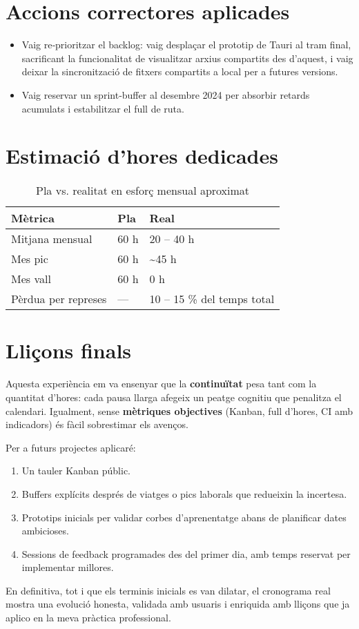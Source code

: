 \section{Accions correctores aplicades}
\begin{itemize}
  \item Vaig re‑prioritzar el backlog: vaig desplaçar el prototip de Tauri al tram final, sacrificant la funcionalitat de visualitzar arxius compartits des d'aquest, i vaig deixar la sincronització de fitxers compartits a local per a futures versions.
  \item Vaig reservar un sprint‑buffer al desembre 2024 per absorbir retards acumulats i estabilitzar el full de ruta.
\end{itemize}

\section{Estimació d'hores dedicades}

\begin{table}[h]
  \centering
  \caption{Pla vs. realitat en esforç mensual aproximat}
  \label{tab:horas}
  \begin{tabular}{@{}p{3.2cm}p{3cm}p{3cm}@{}}
    \toprule
    \textbf{Mètrica} & \textbf{Pla} & \textbf{Real} \\
    \midrule
    Mitjana mensual & 60 h & 20 – 40 h \\
    Mes pic & 60 h & \textasciitilde45 h \\
    Mes vall & 60 h & 0 h \\
    Pèrdua per represes & — & 10 – 15 \% del temps total \\
    \bottomrule
  \end{tabular}
\end{table}

\section{Lliçons finals}

Aquesta experiència em va ensenyar que la \textbf{continuïtat} pesa tant com la quantitat d'hores: cada pausa llarga afegeix un peatge cognitiu que penalitza el calendari. Igualment, sense \textbf{mètriques objectives} (Kanban, full d'hores, CI amb indicadors) és fàcil sobrestimar els avenços.

Per a futurs projectes aplicaré:
\begin{enumerate}
  \item Un tauler Kanban públic.
  \item Buffers explícits després de viatges o pics laborals que redueixin la incertesa.
  \item Prototips inicials per validar corbes d'aprenentatge abans de planificar dates ambicioses.
  \item Sessions de feedback programades des del primer dia, amb temps reservat per implementar millores.
\end{enumerate}

En definitiva, tot i que els terminis inicials es van dilatar, el cronograma real mostra una evolució honesta, validada amb usuaris i enriquida amb lliçons que ja aplico en la meva pràctica professional.

